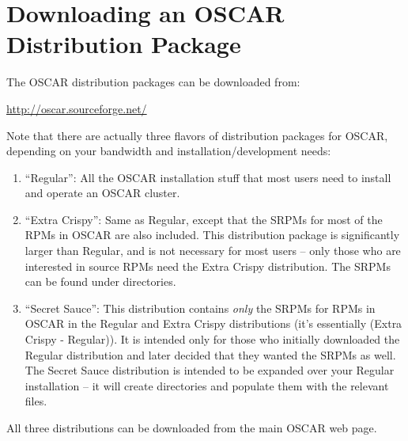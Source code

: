 %
%
%

\section{Downloading an OSCAR Distribution Package}
\label{sec:download}

The OSCAR distribution packages can be downloaded from:

\vspace{11pt}
\centerline{\url{http://oscar.sourceforge.net/}}
\vspace{11pt}

Note that there are actually three flavors of distribution packages
for OSCAR, depending on your bandwidth and installation/development
needs:

\begin{enumerate}
\item ``Regular'': All the OSCAR installation stuff that most users
  need to install and operate an OSCAR cluster.
  
\item ``Extra Crispy'': Same as Regular, except that the SRPMs for
  most of the RPMs in OSCAR are also included.  This distribution
  package is significantly larger than Regular, and is not necessary
  for most users -- only those who are interested in source RPMs need
  the Extra Crispy distribution.  The SRPMs can be found under
   directories.
  
\item ``Secret Sauce'': This distribution contains {\em only} the
  SRPMs for RPMs in OSCAR in the Regular and Extra Crispy
  distributions (it's essentially (Extra Crispy - Regular)).  It is
  intended only for those who initially downloaded the Regular
  distribution and later decided that they wanted the SRPMs as well.
  The Secret Sauce distribution is intended to be expanded over your
  Regular installation -- it will create 
  directories and populate them with the relevant 
  files.
\end{enumerate}

All three distributions can be downloaded from the main OSCAR web
page.


